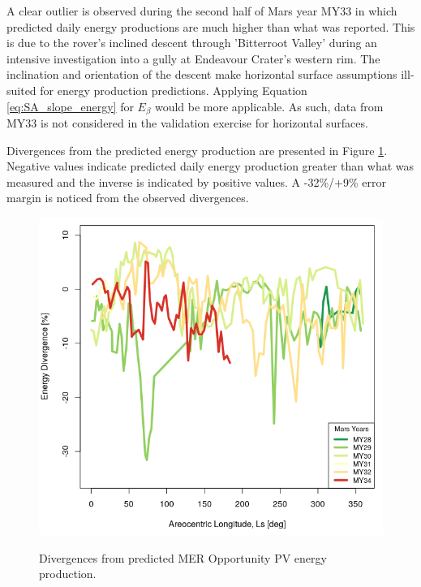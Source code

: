 
A clear outlier is observed during the second half of Mars year MY33 in which predicted daily energy productions are much higher than what was reported. This is due to the rover's inclined descent through 'Bitterroot Valley' during an intensive investigation into a gully at Endeavour Crater's western rim. The inclination and orientation of the descent make horizontal surface assumptions ill-suited for energy production predictions. Applying Equation \ref{eq:SA_slope_energy} for $E_{\beta}$ would be more applicable. As such, data from MY33 is not considered in the validation exercise for horizontal surfaces.


Divergences from the predicted energy production are presented in Figure \ref{fig:plot:mer-energy-prediction-divergences}. Negative values indicate predicted daily energy production greater than what was measured and the inverse is indicated by positive values. A -32\%/+9\% error margin is noticed from the observed divergences.

\begin{figure}[H]
  \centering
  \hypersetup{linkcolor=captionTextColor}
  \includegraphics[width=0.8\linewidth]{sections/power-and-energy-predictions/plots/energy-prediction-divergences.png}\\
  \caption[Divergences from predicted MER Opportunity PV energy production]
          {Divergences from predicted MER Opportunity PV energy production.}
  \label{fig:plot:mer-energy-prediction-divergences}
\end{figure}

